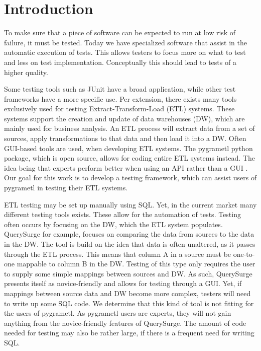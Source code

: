 \section{Introduction}\label{intro} %
To make sure that a piece of software can be expected to run at low risk of failure, it must be tested. Today we have specialized software that assist in the automatic execution of tests. This allows testers to focus more on what to test and less on test implementation. Conceptually this should lead to tests of a higher quality.

Some testing tools such as JUnit have a broad application, while other test frameworks have a more specific use. Per extension, there exists many tools exclusively used for testing Extract-Transform-Load (ETL) systems. These systems support the creation and update of data warehouses (DW), which are mainly used for business analysis. An ETL process will extract data from a set of sources, apply transformations to that data and then load it into a DW. Often GUI-based tools are used, when developing ETL systems. The pygrametl python package, which is open source, allows for coding entire ETL systems instead. The idea being that experts perform better when using an API rather than a GUI \cite{thomsen2009pygrametl}. Our goal for this work is to develop a testing framework, which can assist users of pygrametl in testing their ETL systems.

ETL testing may be set up manually using SQL. Yet, in the current market many different testing tools exists. These allow for the automation of tests. Testing often occurs by focusing on the DW, which the ETL system populates. QuerySurge\cite{QuerySurge} for example, focuses on comparing the data from sources to the data in the DW. The tool is build on the idea that data is often unaltered, as it passes through the ETL process. This means that column A in a source must be one-to-one mappable to column B in the DW. Testing of this type only requires the user to supply some simple mappings between sources and DW. As such, QuerySurge presents itself as novice-friendly and allows for testing through a GUI. Yet, if mappings between source data and DW become more complex, testers will need to write up some SQL code. We determine that this kind of tool is not fitting for the users of pygrametl. As pygrametl users are experts, they will not gain anything from the novice-friendly features of QuerySurge. The amount of code needed for testing may also be rather large, if there is a frequent need for writing SQL.

